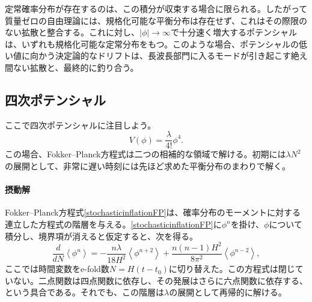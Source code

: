 \documentclass[a4paper,11pt,oneside]{article}
\theoremstyle{definition}
\numberwithin{equation}{section}
\begin{document}
定常確率分布が存在するのは、この積分が収束する場合に限られる。したがって質量ゼロの自由理論には、規格化可能な平衡分布は存在せず、これはその際限のない拡散と整合する。これに対し、\(\lvert\phi\rvert\rightarrow\infty\)で十分速く増大するポテンシャルは、いずれも規格化可能な定常分布をもつ。このような場合、ポテンシャルの低い値に向かう決定論的なドリフトは、長波長部門に入るモードが引き起こす絶え間ない拡散と、最終的に釣り合う。




 

\subsection{四次ポテンシャル}



ここで四次ポテンシャルに注目しよう。
\begin{equation}
V(\phi)
=
\frac{\lambda}{4!}\phi^{4}.
\end{equation}
この場合、Fokker--Planck方程式は二つの相補的な領域で解ける。初期には$ \lambda N^{2}$の展開として、非常に遅い時刻には先ほど求めた平衡分布のまわりで解く。





\paragraph{摂動解} Fokker--Planck方程式\eqref{stochasticinflationFP}は、確率分布のモーメントに対する連立した方程式の階層を与える。\eqref{stochasticinflationFP}に\(\phi^{n}\)を掛け、\(\phi\)について積分し、境界項が消えると仮定すると、次を得る。
\begin{equation}\label{quarticmomenthierarchy}
\frac{d}{dN}
\left\langle
\phi^{n}
\right\rangle
=
-
\frac{n\lambda}{18H^{2}}
\left\langle
\phi^{n+2}
\right\rangle
+
\frac{n(n-1)H^{2}}{8\pi^{2}}
\left\langle
\phi^{n-2}
\right\rangle ,
\end{equation}
ここでは時間変数をe-fold数\(N=H(t-t_{0})\)に切り替えた。この方程式は閉じていない。二点関数は四点関数に依存し、その発展はさらに六点関数に依存する、という具合である。それでも、この階層は\(\lambda\)の展開として再帰的に解ける。
\end{document}
